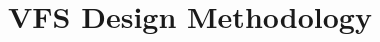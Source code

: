 \documentclass[manuscript,screen,review]{acmart}
\begin{document}
	

	
%
	
\section{VFS Design Methodology}\label{VFS_Methodology}

\end{document}
